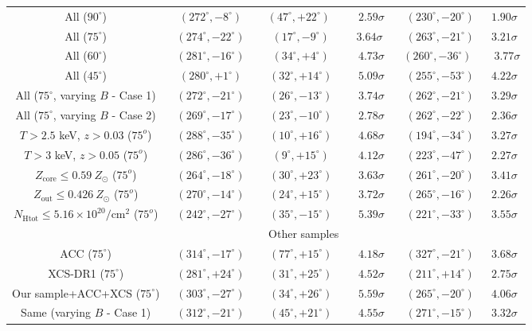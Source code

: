 \documentclass{aa}   %
\begin{document}
\begin{table}[hbtp]
\begin{center}
\begin{tabular}{ c  c  c  c  c  c}
All ($90^{\circ}$) &\ $(272^{\circ}, -8^{\circ})$\ & \ $(47^{\circ}, +22^{\circ})$ \ & $2.59\sigma$ & $(230^{\circ}, -20^{\circ})$ & $1.90\sigma$\\ 
All ($75^{\circ}$) & $(274^{\circ}, -22^{\circ})$ & \ $(17^{\circ}, -9^{\circ})$\ & \ $3.64\sigma$ \ & $(263^{\circ}, -21^{\circ})$ & $3.21\sigma$ \\
All ($60^{\circ}$) &\ $(281^{\circ}, -16^{\circ})$\ & \ $(34^{\circ}, +4^{\circ})$\ & $4.73\sigma$ & $(260^{\circ}, -36^{\circ})$\ & \ $3.77\sigma$\\
All ($45^{\circ}$) &\ $(280^{\circ}, +1^{\circ})$\ & \ $(32^{\circ}, +14^{\circ})$\ & $5.09\sigma$ & $(255^{\circ}, -53^{\circ})$ & $4.22\sigma$\\  \hline
All ($75^{\circ}$, varying $B$ - Case 1) &\ $(272^{\circ}, -21^{\circ})$\ & \ $(26^{\circ}, -13^{\circ})$\ & $3.74\sigma$ & $(262^{\circ}, -21^{\circ})$ & $3.29\sigma$\\ 
All ($75^{\circ}$, varying $B$ - Case 2) &\ $(269^{\circ}, -17^{\circ})$\ & \ $(23^{\circ}, -10^{\circ})$\ & $2.78\sigma$ & $(262^{\circ}, -22^{\circ})$ & $2.36\sigma$\\  \hline
$T>2.5$ keV, $z>0.03$ ($75^o$) &\  $(288^{\circ}, -35^{\circ})$\ & \ $(10^{\circ}, +16^{\circ})$\ & $4.68\sigma$ & $(194^{\circ}, -34^{\circ})$ & $3.27\sigma$\\ 
$T>3$ keV, $z>0.05$ ($75^o$) &\ $(286^{\circ}, -36^{\circ})$\ & \ $(9^{\circ}, +15^{\circ})$\ & $4.12\sigma$ & $(223^{\circ}, -47^{\circ})$ & $2.27\sigma$\\ 
$Z_{\text{core}}\leq 0.59\ Z_{\odot}$ ($75^o$) &\ $(264^{\circ}, -18^{\circ})$\ & \ $(30^{\circ}, +23^{\circ})$\ & $3.63\sigma$ & $(261^{\circ}, -20^{\circ})$ & $3.41\sigma$\\ 
$Z_{\text{out}}\leq 0.426\ Z_{\odot}$ ($75^o$) &\ $(270^{\circ}, -14^{\circ})$\ & \ $(24^{\circ}, +15^{\circ})$\ & $3.72\sigma$ & $(265^{\circ}, -16^{\circ})$ & $2.26\sigma$\\ 
$N_{\text{Htot}}\leq 5.16\times 10^{20}/$cm$^2$ ($75^o$) &\ $(242^{\circ}, -27^{\circ})$\ & \ $(35^{\circ}, -15^{\circ})$\ & $5.39\sigma$ & $(221^{\circ}, -33^{\circ})$ & $3.55\sigma$\\

 \hline
 
  & &\ Other samples& & &\\ \hline
ACC ($75^{\circ}$) &\ $(314^{\circ}, -17^{\circ})$\ & \ $(77^{\circ}, +15^{\circ})$\ & $4.18\sigma$ & $(327^{\circ}, -21^{\circ})$ & $3.68\sigma$\\
XCS-DR1 ($75^{\circ}$) &\ $(281^{\circ}, +24^{\circ})$\ & \ $(31^{\circ}, +25^{\circ})$\ & $4.52\sigma$ & $(211^{\circ}, +14^{\circ})$ & $2.75\sigma$\\ \hline
Our sample+ACC+XCS ($75^{\circ}$) &\ $(303^{\circ}, -27^{\circ})$\ & \ $(34^{\circ}, +26^{\circ})$\ & $5.59\sigma$ & $(265^{\circ}, -20^{\circ})$ & $4.06\sigma$\\ 
Same (varying $B$ - Case 1) &\ $(312^{\circ}, -21^{\circ})$\ & \ $(45^{\circ}, +21^{\circ})$\ & $4.55\sigma$ & $(271^{\circ}, -15^{\circ})$ & $3.32\sigma$\\ \hline


\end{tabular}
\end{center}
\end{table}
\end{document}
